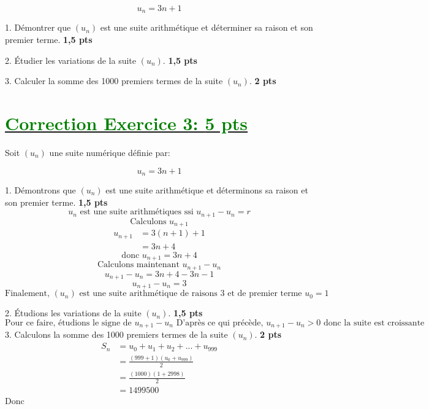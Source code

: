 \documentclass[12pt]{article}
\begin{document}
\[ u_n = 3n + 1 \]

1. Démontrer que $(u_n)$ est une suite arithmétique et déterminer sa raison et son premier terme. \textbf{1,5 pts}

2. Étudier les variations de la suite $(u_n)$. \textbf{1,5 pts}

3. Calculer la somme des 1000 premiers termes de la suite $(u_n)$. \textbf{2 pts}

\section*{\underline{\textcolor{green}{Correction Exercice 3: \textbf{5 pts}}}}
Soit $(u_n)$ une suite numérique définie par:

\[ u_{n} = 3n + 1 \]

1. Démontrons que $(u_n)$ est une suite arithmétique et déterminons sa raison et son premier terme. \textbf{1,5 pts}
\[u_{n} \text{ est une suite arithmétiques ssi }  u_{n+1}-u_{n}=r \]
\[\text{Calculons } u_{n+1}\]
\begin{align*}
u_{n+1}&=3(n+1) + 1\\
&=3n+4
\end{align*}
\[\text{donc } u_{n+1}=3n+4\]
\[\text{Calculons maintenant } u_{n+1}-u_{n}\]
\[u_{n+1}-u_{n}=3n+4-3n-1\]
\[u_{n+1}-u_{n}=3\]
\[\text{Finalement, } (u_{n}) \text{ est une suite arithmétique de raisons } 3 \text{ et de premier terme  } u_{0}=1\]

2. Étudions les variations de la suite $(u_n)$. \textbf{1,5 pts}
\[\text{Pour ce faire, étudions le signe de } u_{n+1}-u_{n} \text{ D'après ce qui précède, } u_{n+1}-u_{n}>0 \text{ donc la suite est croissante}\]
3. Calculons la somme des 1000 premiers termes de la suite $(u_n)$. \textbf{2 pts}
\begin{align*}
S_{n}&=u_{0}+u_{1}+u_{2}+...+u_{999}\\
	&=\frac{(999+1)(u_{0}+u_{999})}{2}\\
	&=\frac{(1000)(1+2998)}{2}\\
	&=1499500
\end{align*}
Donc \textcolor{green}{}
\end{document}
